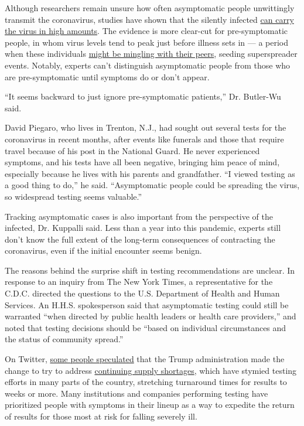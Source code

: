 Although researchers remain unsure how often asymptomatic people
unwittingly transmit the coronavirus, studies have shown that the
silently infected
\href{https://www.nytimes3xbfgragh.onion/2020/08/06/health/coronavirus-asymptomatic-transmission.html}{can
carry the virus in high amounts}. The evidence is more clear-cut for
pre-symptomatic people, in whom virus levels tend to peak just before
illness sets in --- a period when these individuals
\href{https://www.nytimes3xbfgragh.onion/2020/08/07/health/coronavirus-superspreading-contagion.html}{might
be mingling with their peers}, seeding superspreader events. Notably,
experts can't distinguish asymptomatic people from those who are
pre-symptomatic until symptoms do or don't appear.

``It seems backward to just ignore pre-symptomatic patients,'' Dr.
Butler-Wu said.

David Piegaro, who lives in Trenton, N.J., had sought out several tests
for the coronavirus in recent months, after events like funerals and
those that require travel because of his post in the National Guard. He
never experienced symptoms, and his tests have all been negative,
bringing him peace of mind, especially because he lives with his parents
and grandfather. ``I viewed testing as a good thing to do,'' he said.
``Asymptomatic people could be spreading the virus, so widespread
testing seems valuable.''

Tracking asymptomatic cases is also important from the perspective of
the infected, Dr. Kuppalli said. Less than a year into this pandemic,
experts still don't know the full extent of the long-term consequences
of contracting the coronavirus, even if the initial encounter seems
benign.

The reasons behind the surprise shift in testing recommendations are
unclear. In response to an inquiry from The New York Times, a
representative for the C.D.C. directed the questions to the U.S.
Department of Health and Human Services. An H.H.S. spokesperson said
that asymptomatic testing could still be warranted ``when directed by
public health leaders or health care providers,'' and noted that testing
decisions should be ``based on individual circumstances and the status
of community spread.''

On Twitter,
\href{https://twitter.com/angie_rasmussen/status/1298003530033147904/retweets/with_comments}{some
people speculated} that the Trump administration made the change to try
to address
\href{https://www.nytimes3xbfgragh.onion/2020/07/23/health/coronavirus-testing-supply-shortage.html}{continuing
supply shortages}, which have stymied testing efforts in many parts of
the country, stretching turnaround times for results to weeks or more.
Many institutions and companies performing testing have prioritized
people with symptoms in their lineup as a way to expedite the return of
results for those most at risk for falling severely ill.

